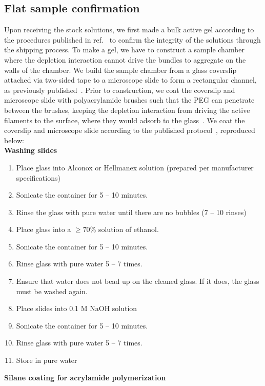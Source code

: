 \subsection{Flat sample confirmation}
Upon receiving the stock solutions, we first made a bulk active gel according to the procedures published in ref.~\cite{RN3} to confirm the integrity of the solutions through the shipping process.
To make a gel, we have to construct a sample chamber where the depletion interaction cannot drive the bundles to aggregate on the walls of the chamber.
We build the sample chamber from a glass coverslip attached via two-sided tape to a microscope slide to form a rectangular channel, as previously published~\cite{RN3}.
Prior to construction, we coat the coverslip and microscope slide with polyacrylamide brushes such that the PEG can penetrate between the brushes, keeping the depletion interaction from driving the active filaments to the surface, where they would adsorb to the glass~\cite{RN3}.
We coat the coverslip and microscope slide according to the published protocol~\cite{RN3}, reproduced below:\\
{\bf Washing slides}
\begin{enumerate}
  \item Place glass into Alconox or Hellmanex solution (prepared per manufacturer specifications)
  \item Sonicate the container for 5 -- 10 minutes.
  \item Rinse the glass with pure water until there are no bubbles (7 -- 10 rinses)
  \item Place glass into a $\geq 70$\% solution of ethanol.
  \item Sonicate the container for 5 -- 10 minutes.
  \item Rinse glass with pure water 5 -- 7 times.
  \item Ensure that water does not bead up on the cleaned glass. If it does, the glass must be washed again.
  \item Place slides into 0.1 M NaOH solution
  \item Sonicate the container for 5 -- 10 minutes.
  \item Rinse glass with pure water 5 -- 7 times.
  \item Store in pure water
\end{enumerate}
{\bf Silane coating for acrylamide polymerization}
